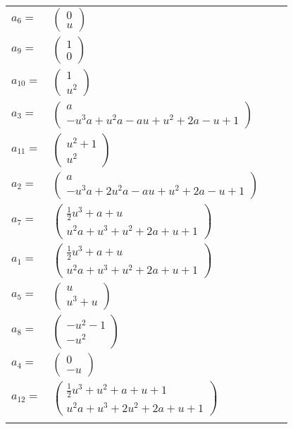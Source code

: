 \documentclass[1p]{elsarticle_modified}
\theoremstyle{definition}
\begin{document}
\begin{tabular}{m{7pt} m{180pt} m{7pt} m{180pt} }
\flushright $a_{6}=$&$\begin{pmatrix}0\\u\end{pmatrix}$ \\
\flushright $a_{9}=$&$\begin{pmatrix}1\\0\end{pmatrix}$ \\
\flushright $a_{10}=$&$\begin{pmatrix}1\\u^2\end{pmatrix}$ \\
\flushright $a_{3}=$&$\begin{pmatrix}a\\- u^3 a+u^2 a- a u+u^2+2 a- u+1\end{pmatrix}$ \\
\flushright $a_{11}=$&$\begin{pmatrix}u^2+1\\u^2\end{pmatrix}$ \\
\flushright $a_{2}=$&$\begin{pmatrix}a\\- u^3 a+2 u^2 a- a u+u^2+2 a- u+1\end{pmatrix}$ \\
\flushright $a_{7}=$&$\begin{pmatrix}\frac{1}{2} u^3+a+u\\u^2 a+u^3+u^2+2 a+u+1\end{pmatrix}$ \\
\flushright $a_{1}=$&$\begin{pmatrix}\frac{1}{2} u^3+a+u\\u^2 a+u^3+u^2+2 a+u+1\end{pmatrix}$ \\
\flushright $a_{5}=$&$\begin{pmatrix}u\\u^3+u\end{pmatrix}$ \\
\flushright $a_{8}=$&$\begin{pmatrix}- u^2-1\\- u^2\end{pmatrix}$ \\
\flushright $a_{4}=$&$\begin{pmatrix}0\\- u\end{pmatrix}$ \\
\flushright $a_{12}=$&$\begin{pmatrix}\frac{1}{2} u^3+u^2+a+u+1\\u^2 a+u^3+2 u^2+2 a+u+1\end{pmatrix}$\\&\end{tabular}
\end{document}
